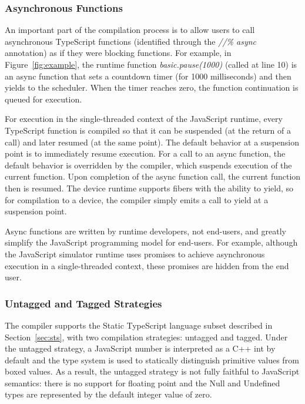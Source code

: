 \subsubsection{Asynchronous Functions}

An important part of the compilation process is to allow users to call asynchronous 
TypeScript functions (identified through the \emph{//\% async} annotation) 
as if they were blocking functions.  For example, in Figure~\ref{fig:example}, the runtime 
function \emph{basic.pause(1000)} (called at line 10) 
is an async function that sets a countdown timer (for 1000 milliseconds) 
and then yields to the scheduler. When the timer 
reaches zero, the function continuation is queued for execution. 

For execution in the single-threaded context of the JavaScript runtime,
every TypeScript function is compiled so that it can be suspended (at the return of a call) and later resumed (at the same point). 
The default behavior at a suspension point is to immediately resume execution.  For a call to an async function,
the default behavior is overridden by the compiler, which suspends execution of the current function. 
Upon completion of the async function call, the current function then is resumed. 
The \CO device runtime supports fibers with the ability to yield, so for compilation to a device, 
the compiler simply emits a call to yield at a suspension point.

Async functions are written by runtime developers, not end-users, and greatly simplify the JavaScript
programming model for end-users. For example, although the JavaScript simulator runtime uses promises to 
achieve asynchronous execution in a single-threaded context, these promises are hidden from the end user. 

\subsubsection{Untagged and Tagged Strategies}

The \MC compiler supports the Static TypeScript language subset described in Section~\ref{sec:sts},
with two compilation strategies: untagged and tagged. Under the untagged strategy,
a JavaScript number is interpreted as a C++ int by default and the type system is used
to statically distinguish primitive values from boxed values. As a result, the untagged
strategy is not fully faithful to JavaScript semantics: there is no support for floating
point and the Null and Undefined types are represented by the default integer value of zero.

